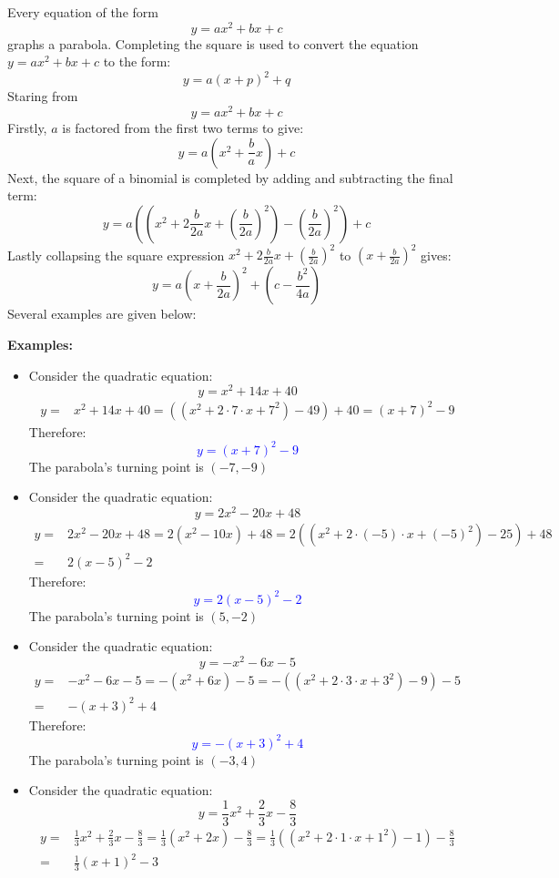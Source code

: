 \documentclass{article}
\newcommand{\dg}[1]{\textcolor{dark_green}{#1}}
\newcommand{\blue}[1]{\textcolor{blue}{#1}}
\begin{document}
Every equation of the form 
\[y = ax^2 + bx + c\]
graphs a parabola. Completing the square is used to convert the equation \(y = ax^2 + bx + c\) to the form:
\[y = a(x + p)^2 + q\] 
Staring from 
\[y = ax^2 + bx + c\]
Firstly, \(a\) is factored from the first two terms to give:
\[y = a(x^2 + \frac{b}{a}x) + c\]
Next, the square of a binomial is completed by adding and subtracting the final term:
\[y = a((x^2 + 2\frac{b}{2a}x + (\frac{b}{2a})^2) - (\frac{b}{2a})^2) + c\]
Lastly collapsing the square expression \(x^2 + 2\frac{b}{2a}x + (\frac{b}{2a})^2\) to \((x + \frac{b}{2a})^2\) gives:
\[y = a(x + \frac{b}{2a})^2 + (c - \frac{b^2}{4a})\]
Several examples are given below:


\textbf{Examples:}
\begin{itemize}
\item Consider the quadratic equation:
\dg{\[y = x^2 + 14x + 40\]}
\begin{align*}
y = & x^2 + 14x + 40 
= ((x^2 + 2 \cdot 7 \cdot x + 7^2) - 49) + 40 
= (x + 7)^2 - 9
\end{align*}
Therefore:
\blue{\[y = (x + 7)^2 - 9\]}
The parabola's turning point is \((-7, -9)\)
\item Consider the quadratic equation:
\dg{\[y = 2x^2 - 20x + 48\]}
\begin{align*}
y = & 2x^2 - 20x + 48 
= 2(x^2 - 10x) + 48 
= 2((x^2 + 2 \cdot (-5) \cdot x + (-5)^2) - 25) + 48 \\
= & 2(x - 5)^2 - 2
\end{align*}
Therefore:
\blue{\[y = 2(x - 5)^2 - 2\]}
The parabola's turning point is \((5, -2)\)
\item Consider the quadratic equation:
\dg{\[y = -x^2 - 6x - 5\]}
\begin{align*}
y = & -x^2 - 6x - 5 
= -(x^2 + 6x) - 5 
= -((x^2 + 2 \cdot 3 \cdot x + 3^2) - 9) - 5 \\
= & -(x + 3)^2 + 4
\end{align*}
Therefore: 
\blue{\[y = -(x + 3)^2 + 4\]}
The parabola's turning point is \((-3, 4)\)
\item Consider the quadratic equation:
\dg{\[y = \frac{1}{3}x^2 + \frac{2}{3}x - \frac{8}{3}\]}
\begin{align*}
y = & \frac{1}{3}x^2 + \frac{2}{3}x - \frac{8}{3}  
= \frac{1}{3}(x^2 + 2x) - \frac{8}{3} 
= \frac{1}{3}((x^2 + 2 \cdot 1 \cdot x + 1^2) - 1) - \frac{8}{3} \\
= & \frac{1}{3}(x + 1)^2 - 3
\end{align*}

\end{itemize}
\end{document}
